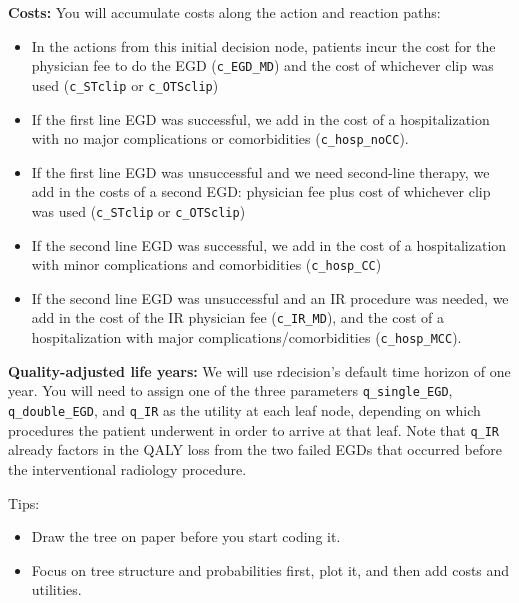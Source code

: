 \documentclass[
  letterpaper,
  DIV=11,
  numbers=noendperiod]{scrartcl}
\begin{document}
\textbf{Costs:} You will accumulate costs along the action and reaction
paths:

\begin{itemize}
\item
  In the actions from this initial decision node, patients incur the
  cost for the physician fee to do the EGD (\texttt{c\_EGD\_MD}) and the
  cost of whichever clip was used (\texttt{c\_STclip} or
  \texttt{c\_OTSclip})
\item
  If the first line EGD was successful, we add in the cost of a
  hospitalization with no major complications or comorbidities
  (\texttt{c\_hosp\_noCC}).
\item
  If the first line EGD was unsuccessful and we need second-line
  therapy, we add in the costs of a second EGD: physician fee plus cost
  of whichever clip was used (\texttt{c\_STclip} or \texttt{c\_OTSclip})
\item
  If the second line EGD was successful, we add in the cost of a
  hospitalization with minor complications and comorbidities
  (\texttt{c\_hosp\_CC})
\item
  If the second line EGD was unsuccessful and an IR procedure was
  needed, we add in the cost of the IR physician fee
  (\texttt{c\_IR\_MD}), and the cost of a hospitalization with major
  complications/comorbidities (\texttt{c\_hosp\_MCC}).
\end{itemize}

\textbf{Quality-adjusted life years:} We will use rdecision's default
time horizon of one year. You will need to assign one of the three
parameters \texttt{q\_single\_EGD}, \texttt{q\_double\_EGD}, and
\texttt{q\_IR} as the utility at each leaf node, depending on which
procedures the patient underwent in order to arrive at that leaf. Note
that \texttt{q\_IR} already factors in the QALY loss from the two failed
EGDs that occurred before the interventional radiology procedure.

Tips:

\begin{itemize}
\item
  Draw the tree on paper before you start coding it.
\item
  Focus on tree structure and probabilities first, plot it, and then add
  costs and utilities.
\end{itemize}
\end{document}
